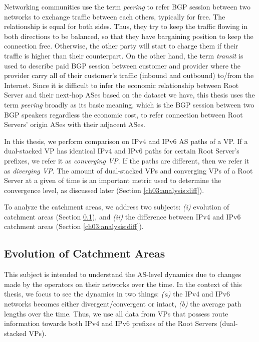 Networking communities use the term \textit{peering} to refer BGP session between two networks to exchange traffic between each others, typically for free. The relationship is equal for both sides. Thus, they try to keep the traffic flowing in both directions to be balanced, so that they have bargaining position to keep the connection free. Otherwise, the other party will start to charge them if their traffic is higher than their counterpart. On the other hand, the term \textit{transit} is used to describe paid BGP session between customer and provider where the provider carry all of their customer's traffic (inbound and outbound) to/from the Internet. Since it is difficult to infer the economic relationship between Root Server and their next-hop ASes based on the dataset we have, this thesis uses the term \textit{peering} broadly as its basic meaning, which is the BGP session between two BGP speakers regardless the economic cost, to refer connection between Root Servers' origin ASes with their adjacent ASes.

In this thesis, we perform comparison on IPv4 and IPv6 AS paths of a VP. If a dual-stacked VP has identical IPv4 and IPv6 paths for certain Root Server's prefixes, we refer it as \textit{converging VP}. If the paths are different, then we refer it as \textit{diverging VP}. The amount of dual-stacked VPs and converging VPs of a Root Server at a given of time is an important metric used to determine the convergence level, as discussed later (Section \ref{ch03:analysis:diff}).

To analyze the catchment areas, we address two subjects: \textit{(i)} evolution of catchment areas (Section \ref{ch03:analysis:evolution}),  and \textit{(ii)} the difference between IPv4 and IPv6 catchment areas (Section \ref{ch03:analysis:diff}). 

\subsection{Evolution of Catchment Areas}
\label{ch03:analysis:evolution}
This subject is intended to understand the AS-level dynamics due to changes made by the operators on their networks over the time. In the context of this thesis, we focus to see the dynamics in two things: \textit{(a)} the IPv4 and IPv6 networks becomes either divergent/convergent or intact, \textit{(b)} the average path lengths over the time. Thus, we use all data from VPs that possess route information towards both IPv4 and IPv6 prefixes of the Root Servers (dual-stacked VPs). 

